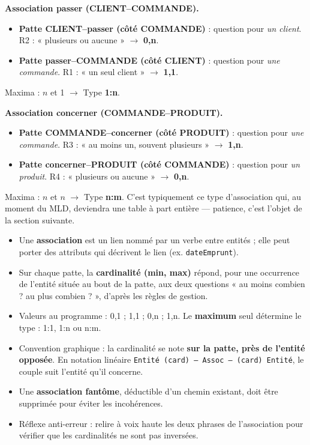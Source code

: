 \documentclass[11pt]{article}
\begin{document}
\begin{corrige}
\textbf{Association passer (CLIENT--COMMANDE).}
\begin{itemize}
\item \textbf{Patte CLIENT--passer (côté COMMANDE)} : question pour \emph{un client}. R2 : « plusieurs ou aucune » $\rightarrow$ \textbf{0,n}.
\item \textbf{Patte passer--COMMANDE (côté CLIENT)} : question pour \emph{une commande}. R1 : « un seul client » $\rightarrow$ \textbf{1,1}.
\end{itemize}
Maxima : $n$ et 1 $\rightarrow$ Type \textbf{1:n}.

\textbf{Association concerner (COMMANDE--PRODUIT).}
\begin{itemize}
\item \textbf{Patte COMMANDE--concerner (côté PRODUIT)} : question pour \emph{une commande}. R3 : « au moins un, souvent plusieurs » $\rightarrow$ \textbf{1,n}.
\item \textbf{Patte concerner--PRODUIT (côté COMMANDE)} : question pour \emph{un produit}. R4 : « plusieurs ou aucune » $\rightarrow$ \textbf{0,n}.
\end{itemize}
Maxima : $n$ et $n$ $\rightarrow$ Type \textbf{n:m}. C'est typiquement ce type d'association qui, au moment du MLD, deviendra une table à part entière — patience, c'est l'objet de la section suivante.
\end{corrige}

\begin{aretenir}
\begin{itemize}
\item Une \textbf{association} est un lien nommé par un verbe entre entités ; elle peut porter des attributs qui décrivent le lien (ex. \texttt{dateEmprunt}).
\item Sur chaque patte, la \textbf{cardinalité (min, max)} répond, pour une occurrence de l'entité située au bout de la patte, aux deux questions « au moins combien ? au plus combien ? », d'après les règles de gestion.
\item Valeurs au programme : 0,1 ; 1,1 ; 0,n ; 1,n. Le \textbf{maximum} seul détermine le type : 1:1, 1:n ou n:m.
\item Convention graphique : la cardinalité se note \textbf{sur la patte, près de l'entité opposée}. En notation linéaire \texttt{Entité (card) -- Assoc -- (card) Entité}, le couple suit l'entité qu'il concerne.
\item Une \textbf{association fantôme}, déductible d'un chemin existant, doit être supprimée pour éviter les incohérences.
\item Réflexe anti-erreur : relire à voix haute les deux phrases de l'association pour vérifier que les cardinalités ne sont pas inversées.
\end{itemize}
\end{aretenir}
\end{document}
